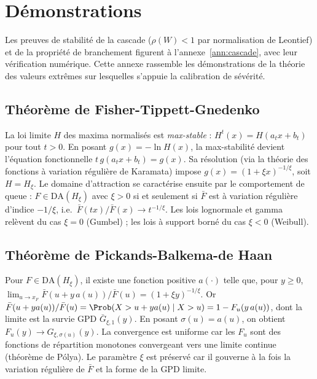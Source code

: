 \chapter{Démonstrations}

\noindent Les preuves de stabilité de la cascade ($\rho(W)<1$ par normalisation de Leontief) et
de la propriété de branchement figurent à l'annexe~\ref{ann:cascade}, avec leur vérification
numérique. Cette annexe rassemble les démonstrations de la théorie des valeurs extrêmes sur
lesquelles s'appuie la calibration de sévérité.

\section{Théorème de Fisher-Tippett-Gnedenko}
\label{soc:ann:ftg}
La loi limite $H$ des maxima normalisés est \emph{max-stable} : $H^t(x)=H(a_tx+b_t)$ pour tout $t>0$. En posant $g(x)=-\ln H(x)$, la max-stabilité devient l'équation fonctionnelle $t\,g(a_tx+b_t)=g(x)$. Sa résolution (via la théorie des fonctions à variation régulière de Karamata) impose $g(x)=(1+\xi x)^{-1/\xi}$, soit $H=H_\xi$. Le domaine d'attraction se caractérise ensuite par le comportement de queue : $F\in\mathrm{DA}(H_\xi)$ avec $\xi>0$ si et seulement si $\bar F$ est à variation régulière d'indice $-1/\xi$, i.e.\ $\bar F(tx)/\bar F(x)\to t^{-1/\xi}$. Les lois lognormale et gamma relèvent du cas $\xi=0$ (Gumbel) ; les lois à support borné du cas $\xi<0$ (Weibull).


\section{Théorème de Pickands-Balkema-de Haan}
\label{soc:ann:balkema}
Pour $F\in\mathrm{DA}(H_\xi)$, il existe une fonction positive $a(\cdot)$ telle que, pour $y\ge0$,
$\lim_{u\to x_F}\bar F(u+y\,a(u))/\bar F(u)=(1+\xi y)^{-1/\xi}$.
Or $\bar F(u+ya(u))/\bar F(u)=\Prob(X>u+ya(u)\mid X>u)=1-F_u(y\,a(u))$, dont la limite est la survie GPD $\bar G_{\xi,1}(y)$. En posant $\sigma(u)=a(u)$, on obtient $F_u(y)\to G_{\xi,\sigma(u)}(y)$. La convergence est uniforme car les $F_u$ sont des fonctions de répartition monotones convergeant vers une limite continue (théorème de Pólya). Le paramètre $\xi$ est préservé car il gouverne à la fois la variation régulière de $\bar F$ et la forme de la GPD limite.



